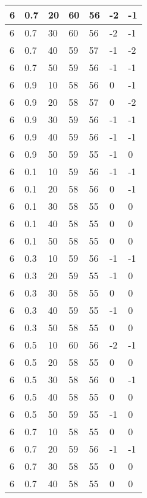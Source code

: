 \begin{longtable}{|l|l|l|l|l|l|l|}
		6     & 0.7 & 20   & 60 & 56 & -2  & -1  \\ \hline
		6     & 0.7 & 30   & 60 & 56 & -2  & -1  \\ \hline
		6     & 0.7 & 40   & 59 & 57 & -1  & -2  \\ \hline
		6     & 0.7 & 50   & 59 & 56 & -1  & -1  \\ \hline
		6     & 0.9 & 10   & 58 & 56 & 0   & -1  \\ \hline
		6     & 0.9 & 20   & 58 & 57 & 0   & -2  \\ \hline
		6     & 0.9 & 30   & 59 & 56 & -1  & -1  \\ \hline
		6     & 0.9 & 40   & 59 & 56 & -1  & -1  \\ \hline
		6     & 0.9 & 50   & 59 & 55 & -1  & 0   \\ \hline
		6     & 0.1 & 10   & 59 & 56 & -1  & -1  \\ \hline
		6     & 0.1 & 20   & 58 & 56 & 0   & -1  \\ \hline
		6     & 0.1 & 30   & 58 & 55 & 0   & 0   \\ \hline
		6     & 0.1 & 40   & 58 & 55 & 0   & 0   \\ \hline
		6     & 0.1 & 50   & 58 & 55 & 0   & 0   \\ \hline
		6     & 0.3 & 10   & 59 & 56 & -1  & -1  \\ \hline
		6     & 0.3 & 20   & 59 & 55 & -1  & 0   \\ \hline
		6     & 0.3 & 30   & 58 & 55 & 0   & 0   \\ \hline
		6     & 0.3 & 40   & 59 & 55 & -1  & 0   \\ \hline
		6     & 0.3 & 50   & 58 & 55 & 0   & 0   \\ \hline
		6     & 0.5 & 10   & 60 & 56 & -2  & -1  \\ \hline
		6     & 0.5 & 20   & 58 & 55 & 0   & 0   \\ \hline
		6     & 0.5 & 30   & 58 & 56 & 0   & -1  \\ \hline
		6     & 0.5 & 40   & 58 & 55 & 0   & 0   \\ \hline
		6     & 0.5 & 50   & 59 & 55 & -1  & 0   \\ \hline
		6     & 0.7 & 10   & 58 & 55 & 0   & 0   \\ \hline
		6     & 0.7 & 20   & 59 & 56 & -1  & -1  \\ \hline
		6     & 0.7 & 30   & 58 & 55 & 0   & 0   \\ \hline
		6     & 0.7 & 40   & 58 & 55 & 0   & 0   \\ \hline

\end{longtable}
